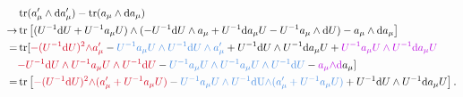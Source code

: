 \documentclass{book}
\begin{document}
\begin{equation*}
\begin{aligned}
 & \operatorname{tr}( a'_{\mu } \land \mathrm{d} a'_{\mu }) -\operatorname{tr}( a_{\mu } \land \mathrm{d} a_{\mu })\\
\rightarrow  & \operatorname{tr}\left[ (U^{-1}\mathrm{d} U+U^{-1} a_{\mu } U)\land (-U^{-1}\mathrm{d} U\land a_{\mu } +U^{-1}\mathrm{d} a_{\mu } U-U^{-1} a_{\mu } \land \mathrm{d} U)-a_{\mu } \land \mathrm{d} a_{\mu }\right]\\
= & \operatorname{tr}[\textcolor[rgb]{0.82,0.01,0.11}{-(U}\textcolor[rgb]{0.82,0.01,0.11}{^{-1}}\mathrm{\textcolor[rgb]{0.82,0.01,0.11}{d}}\textcolor[rgb]{0.82,0.01,0.11}{U)}\textcolor[rgb]{0.82,0.01,0.11}{^{2}}\textcolor[rgb]{0.82,0.01,0.11}{\land a'_{\mu }} -\textcolor[rgb]{0.29,0.56,0.89}{U^{-1}}\textcolor[rgb]{0.29,0.56,0.89}{a_{\mu } U\land U}\textcolor[rgb]{0.29,0.56,0.89}{^{-1}}\mathrm{\textcolor[rgb]{0.29,0.56,0.89}{d}}\textcolor[rgb]{0.29,0.56,0.89}{U\land a'_{\mu }} +U^{-1}\mathrm{d} U\land U^{-1}\mathrm{d} a_{\mu } U+\textcolor[rgb]{0.74,0.06,0.88}{U^{-1}}\textcolor[rgb]{0.74,0.06,0.88}{a_{\mu } U\land U}\textcolor[rgb]{0.74,0.06,0.88}{^{-1}\mathrm{d} a_{\mu } U}\\
 & \textcolor[rgb]{0.82,0.01,0.11}{-U}\textcolor[rgb]{0.82,0.01,0.11}{^{-1}}\mathrm{\textcolor[rgb]{0.82,0.01,0.11}{d}}\textcolor[rgb]{0.82,0.01,0.11}{U\land U}\textcolor[rgb]{0.82,0.01,0.11}{^{-1}}\textcolor[rgb]{0.82,0.01,0.11}{a_{\mu } U\land U}\textcolor[rgb]{0.82,0.01,0.11}{^{-1}}\mathrm{\textcolor[rgb]{0.82,0.01,0.11}{d}}\textcolor[rgb]{0.82,0.01,0.11}{U} -\textcolor[rgb]{0.29,0.56,0.89}{U^{-1}}\textcolor[rgb]{0.29,0.56,0.89}{a_{\mu } U\land U}\textcolor[rgb]{0.29,0.56,0.89}{^{-1}}\textcolor[rgb]{0.29,0.56,0.89}{a_{\mu } U\land U}\textcolor[rgb]{0.29,0.56,0.89}{^{-1}}\mathrm{\textcolor[rgb]{0.29,0.56,0.89}{d}}\textcolor[rgb]{0.29,0.56,0.89}{U} -\textcolor[rgb]{0.74,0.06,0.88}{a_{\mu } \land }\mathrm{\textcolor[rgb]{0.74,0.06,0.88}{d}} a_{\mu }]\\
= & \operatorname{tr}\left[\textcolor[rgb]{0.82,0.01,0.11}{-(U}\textcolor[rgb]{0.82,0.01,0.11}{^{-1}}\mathrm{\textcolor[rgb]{0.82,0.01,0.11}{d}}\textcolor[rgb]{0.82,0.01,0.11}{U)}\textcolor[rgb]{0.82,0.01,0.11}{^{2}}\textcolor[rgb]{0.82,0.01,0.11}{\land (a'_{\mu } +U}\textcolor[rgb]{0.82,0.01,0.11}{^{-1}}\textcolor[rgb]{0.82,0.01,0.11}{a_{\mu } U)} -\textcolor[rgb]{0.29,0.56,0.89}{U^{-1}}\textcolor[rgb]{0.29,0.56,0.89}{a_{\mu } U\land U}\textcolor[rgb]{0.29,0.56,0.89}{^{-1}}\mathrm{\textcolor[rgb]{0.29,0.56,0.89}{dU\land }}\textcolor[rgb]{0.29,0.56,0.89}{(a'_{\mu } +U}\textcolor[rgb]{0.29,0.56,0.89}{^{-1}}\textcolor[rgb]{0.29,0.56,0.89}{a_{\mu } U)} +U^{-1}\mathrm{d} U\land U^{-1}\mathrm{d} a_{\mu } U\right] .
\end{aligned}
\end{equation*}
\end{document}
